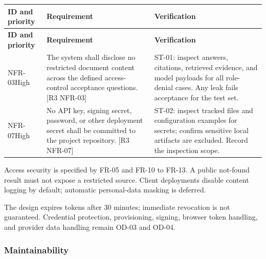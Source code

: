 \documentclass[11pt,letterpaper]{article}
\begin{document}
\begin{longtable}{|P{\arrayrulewidth\relax}|P{\arrayrulewidth\relax}|P{\arrayrulewidth\relax}|}

\hline{}

\textbf{ID and priority} & \textbf{Requirement} & \textbf{Verification} \\ \hline

\endfirsthead

\hline{}

\textbf{ID and priority} & \textbf{Requirement} & \textbf{Verification} \\ \hline

\endhead

\hline\endfoot

\hline\endlastfoot

NFR-03\newline High & The system shall disclose no restricted document content across the defined access-control acceptance questions. [R3 NFR-03] & ST-01: inspect answers, citations, retrieved evidence, and model payloads for all role-denial cases. Any leak fails acceptance for the test set. \\ \hline

NFR-07\newline High & No API key, signing secret, password, or other deployment secret shall be committed to the project repository. [R3 NFR-07] & ST-02: inspect tracked files and configuration examples for secrets; confirm sensitive local artifacts are excluded. Record the inspection scope. \\ \hline

\end{longtable}

\endgroup

Access security is specified by FR-05 and FR-10 to FR-13. A public not-found result must not expose a restricted source. Client deployments disable content logging by default; automatic personal-data masking is deferred.\par

The design expires tokens after 30 minutes; immediate revocation is not guaranteed. Credential protection, provisioning, signing, browser token handling, and provider data handling remain OD-03 and OD-04.\par

\subsubsection{Maintainability}
\end{document}
